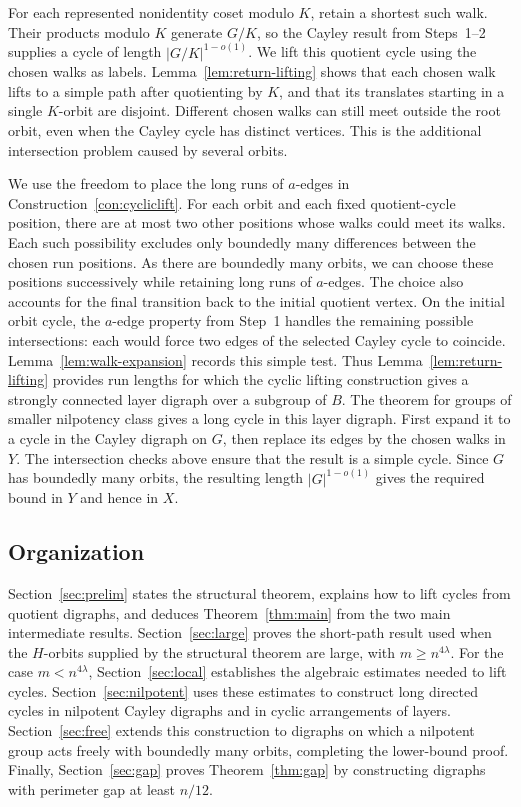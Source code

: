 \documentclass[11pt,a4paper,reqno]{amsart}
\theoremstyle{definition}
\theoremstyle{remark}
\numberwithin{equation}{section}
\begin{document}
For each represented nonidentity coset modulo $K$, retain a shortest such walk. Their products modulo $K$ generate $G/K$, so the Cayley result from Steps~1--2 supplies a cycle of length $|G/K|^{1-o(1)}$. We lift this quotient cycle using the chosen walks as labels. Lemma~\ref{lem:return-lifting} shows that each chosen walk lifts to a simple path after quotienting by $K$, and that its translates starting in a single $K$-orbit are disjoint. Different chosen walks can still meet outside the root orbit, even when the Cayley cycle has distinct vertices. This is the additional intersection problem caused by several orbits.

We use the freedom to place the long runs of $a$-edges in Construction~\ref{con:cycliclift}. For each orbit and each fixed quotient-cycle position, there are at most two other positions whose walks could meet its walks. Each such possibility excludes only boundedly many differences between the chosen run positions. As there are boundedly many orbits, we can choose these positions successively while retaining long runs of $a$-edges. The choice also accounts for the final transition back to the initial quotient vertex. On the initial orbit cycle, the $a$-edge property from Step~1 handles the remaining possible intersections: each would force two edges of the selected Cayley cycle to coincide. Lemma~\ref{lem:walk-expansion} records this simple test. Thus Lemma~\ref{lem:return-lifting} provides run lengths for which the cyclic lifting construction gives a strongly connected layer digraph over a subgroup of $B$. The theorem for groups of smaller nilpotency class gives a long cycle in this layer digraph. First expand it to a cycle in the Cayley digraph on $G$, then replace its edges by the chosen walks in $Y$. The intersection checks above ensure that the result is a simple cycle. Since $G$ has boundedly many orbits, the resulting length $|G|^{1-o(1)}$ gives the required bound in $Y$ and hence in $X$.


\subsection{Organization}
Section~\ref{sec:prelim} states the structural theorem, explains how to lift cycles from quotient digraphs, and deduces Theorem~\ref{thm:main} from the two main intermediate results. Section~\ref{sec:large} proves the short-path result used when the $H$-orbits supplied by the structural theorem are large, with $m\ge n^{4\lambda}$. For the case $m<n^{4\lambda}$, Section~\ref{sec:local} establishes the algebraic estimates needed to lift cycles. Section~\ref{sec:nilpotent} uses these estimates to construct long directed cycles in nilpotent Cayley digraphs and in cyclic arrangements of layers. Section~\ref{sec:free} extends this construction to digraphs on which a nilpotent group acts freely with boundedly many orbits, completing the lower-bound proof. Finally, Section~\ref{sec:gap} proves Theorem~\ref{thm:gap} by constructing digraphs with perimeter gap at least $n/12$.
\end{document}
